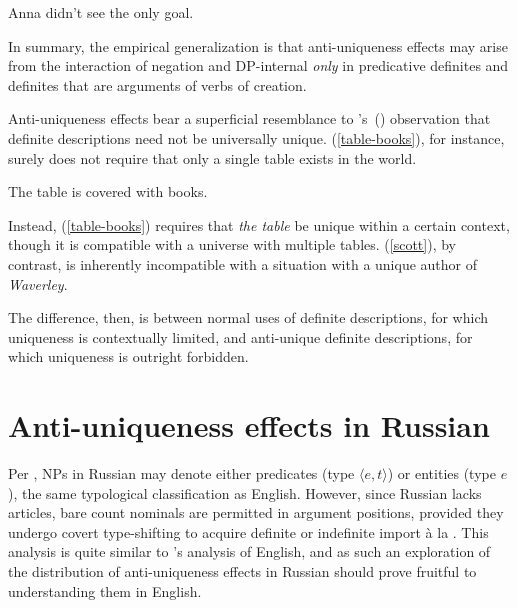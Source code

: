 \documentclass{article}
\newcommand{\citegen}[1]{\citeauthor{#1}'s~(\citeyear{#1})}
\begin{document}
\begin{exe}
	\ex \label{see-only-goal} Anna didn't see the only goal.
\end{exe}

In summary, the empirical generalization is that anti-uniqueness effects may arise from the interaction of negation and DP-internal \textit{only} in predicative definites and definites that are arguments of verbs of creation.

Anti-uniqueness effects bear a superficial resemblance to \citegen{strawson50} observation that definite descriptions need not be universally unique. (\ref{table-books}), for instance, surely does not require that only a single table exists in the world.

\begin{exe}
	\ex \label{table-books} The table is covered with books.
\end{exe}

Instead, (\ref{table-books}) requires that \textit{the table} be unique within a certain context, though it is compatible with a universe with multiple tables. (\ref{scott}), by contrast, is inherently incompatible with a situation with a unique author of \textit{Waverley}.

The difference, then, is between normal uses of definite descriptions, for which uniqueness is contextually limited, and anti-unique definite descriptions, for which uniqueness is outright forbidden.




\section{Anti-uniqueness effects in Russian \label{sec:anti-uniqueness-ru}}
Per \citet{chierchia98}, NPs in Russian may denote either predicates (type $\langle e, t \rangle$) or entities (type $e$), the same typological classification as English. However, since Russian lacks articles, bare count nominals are permitted in argument positions, provided they undergo covert type-shifting to acquire definite or indefinite import \`{a} la \citet{partee86}. This analysis is quite similar to \citeauthor{cb2015}'s analysis of English, and as such an exploration of the distribution of anti-uniqueness effects in Russian should prove fruitful to understanding them in English.
\end{document}
